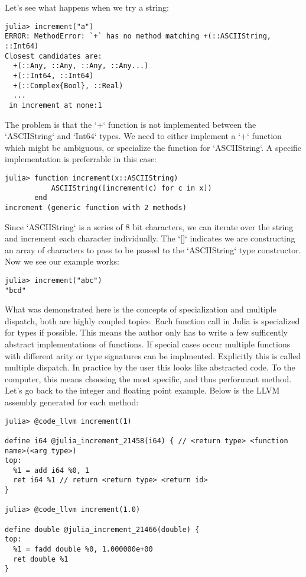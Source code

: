 \documentclass[a4paper]{article}
\begin{document}
Let's see what happens when we try a string:
\begin{lstlisting}
julia> increment("a")
ERROR: MethodError: `+` has no method matching +(::ASCIIString, ::Int64)
Closest candidates are:
  +(::Any, ::Any, ::Any, ::Any...)
  +(::Int64, ::Int64)
  +(::Complex{Bool}, ::Real)
  ...
 in increment at none:1
\end{lstlisting}

The problem is that the `+` function is not implemented between the
`ASCIIString` and `Int64` types. We need to either implement a `+` function
which might be ambiguous, or specialize the function for `ASCIIString`.
A specific implementation is preferrable in this case:
\begin{lstlisting}
julia> function increment(x::ASCIIString)
           ASCIIString([increment(c) for c in x])
       end
increment (generic function with 2 methods)
\end{lstlisting}
Since `ASCIIString` is a series of 8 bit characters, we can iterate over the
string and increment each character individually. The `[]` indicates we are
constructing an array of characters to pass to be passed to the `ASCIIString`
type constructor. Now we see our example works:
\begin{lstlisting}
julia> increment("abc")
"bcd"
\end{lstlisting}

What was demonstrated here is the concepts of specialization and multiple
dispatch, both are highly coupled topics.
Each function call in Julia is specialized for types if possible.
This means the author only has to write a few sufficently abstract
implementations of functions. If special cases occur multiple functions
with different arity or type signatures can be implmented. Explicitly
this is called multiple dispatch. In practice by the user this looks like
abstracted code. To the computer, this means choosing the most specific, and
thus performant method. Let's go back to the integer and floating point
example. Below is the LLVM assembly generated for each method:
\begin{lstlisting}
julia> @code_llvm increment(1)

define i64 @julia_increment_21458(i64) { // <return type> <function name>(<arg type>)
top:
  %1 = add i64 %0, 1
  ret i64 %1 // return <return type> <return id>
}

julia> @code_llvm increment(1.0)

define double @julia_increment_21466(double) {
top:
  %1 = fadd double %0, 1.000000e+00
  ret double %1
}
\end{lstlisting}
\end{document}
